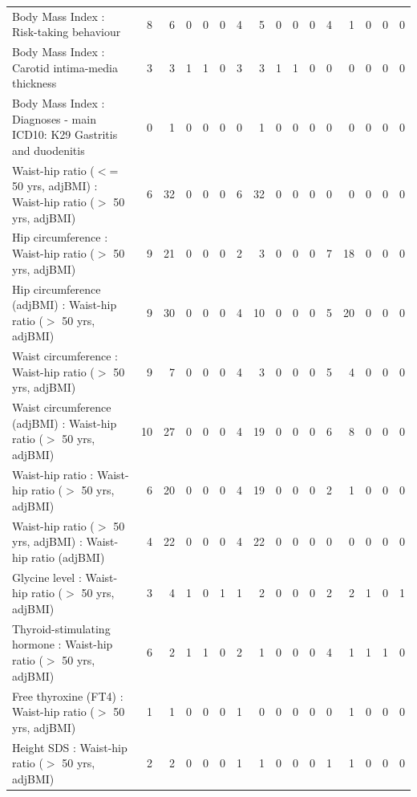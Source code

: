 \begin{table}[ht]
\begin{tabular}{lrrrrrrrrrrrrrrr}
  Body Mass Index  : Risk-taking behaviour &   8 &   6 &   0 &   0 &   0 &   4 &   5 &   0 &   0 &   0 &   4 &   1 &   0 &   0 &   0 \\ 
  Body Mass Index  : Carotid intima-media thickness &   3 &   3 &   1 &   1 &   0 &   3 &   3 &   1 &   1 &   0 &   0 &   0 &   0 &   0 &   0 \\ 
  Body Mass Index  : Diagnoses - main ICD10: K29 Gastritis and duodenitis &   0 &   1 &   0 &   0 &   0 &   0 &   1 &   0 &   0 &   0 &   0 &   0 &   0 &   0 &   0 \\ 
  Waist-hip ratio ($<$= 50 yrs, adjBMI) : Waist-hip ratio ($>$ 50 yrs, adjBMI) &   6 &  32 &   0 &   0 &   0 &   6 &  32 &   0 &   0 &   0 &   0 &   0 &   0 &   0 &   0 \\ 
  Hip circumference  : Waist-hip ratio ($>$ 50 yrs, adjBMI) &   9 &  21 &   0 &   0 &   0 &   2 &   3 &   0 &   0 &   0 &   7 &  18 &   0 &   0 &   0 \\ 
  Hip circumference (adjBMI) : Waist-hip ratio ($>$ 50 yrs, adjBMI) &   9 &  30 &   0 &   0 &   0 &   4 &  10 &   0 &   0 &   0 &   5 &  20 &   0 &   0 &   0 \\ 
  Waist circumference  : Waist-hip ratio ($>$ 50 yrs, adjBMI) &   9 &   7 &   0 &   0 &   0 &   4 &   3 &   0 &   0 &   0 &   5 &   4 &   0 &   0 &   0 \\ 
  Waist circumference (adjBMI) : Waist-hip ratio ($>$ 50 yrs, adjBMI) &  10 &  27 &   0 &   0 &   0 &   4 &  19 &   0 &   0 &   0 &   6 &   8 &   0 &   0 &   0 \\ 
  Waist-hip ratio  : Waist-hip ratio ($>$ 50 yrs, adjBMI) &   6 &  20 &   0 &   0 &   0 &   4 &  19 &   0 &   0 &   0 &   2 &   1 &   0 &   0 &   0 \\ 
  Waist-hip ratio ($>$ 50 yrs, adjBMI) : Waist-hip ratio (adjBMI) &   4 &  22 &   0 &   0 &   0 &   4 &  22 &   0 &   0 &   0 &   0 &   0 &   0 &   0 &   0 \\ 
  Glycine level  : Waist-hip ratio ($>$ 50 yrs, adjBMI) &   3 &   4 &   1 &   0 &   1 &   1 &   2 &   0 &   0 &   0 &   2 &   2 &   1 &   0 &   1 \\ 
  Thyroid-stimulating hormone  : Waist-hip ratio ($>$ 50 yrs, adjBMI) &   6 &   2 &   1 &   1 &   0 &   2 &   1 &   0 &   0 &   0 &   4 &   1 &   1 &   1 &   0 \\ 
  Free thyroxine (FT4) : Waist-hip ratio ($>$ 50 yrs, adjBMI) &   1 &   1 &   0 &   0 &   0 &   1 &   0 &   0 &   0 &   0 &   0 &   1 &   0 &   0 &   0 \\ 
  Height SDS : Waist-hip ratio ($>$ 50 yrs, adjBMI) &   2 &   2 &   0 &   0 &   0 &   1 &   1 &   0 &   0 &   0 &   1 &   1 &   0 &   0 &   0 \\ 

\end{tabular}
\end{table}
